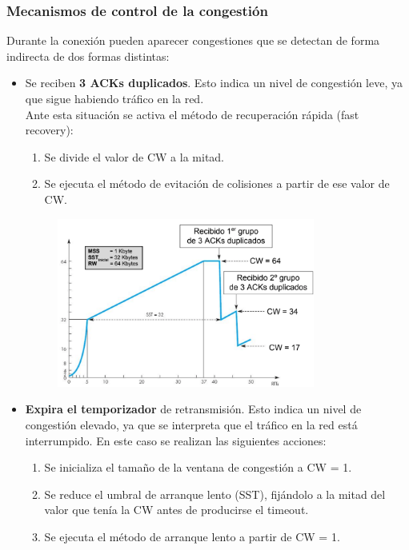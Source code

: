 \subsubsection{Mecanismos de control de la congestión}
Durante la conexión pueden aparecer congestiones que se detectan de forma indirecta de dos formas distintas:
\begin{itemize}
    \item Se reciben \textbf{3 ACKs duplicados}. Esto indica un nivel de congestión leve, ya que sigue habiendo tráfico en la red.\\
    
    Ante esta situación se activa el método de recuperación rápida (fast recovery):
    \begin{enumerate}
        \item Se divide el valor de CW a la mitad.
        \item Se ejecuta el método de evitación de colisiones a partir de ese valor de CW.
    \end{enumerate}
        \begin{figure}[H] \centering
        \includegraphics[width=0.8\textwidth]{img/TCP_3acks.png}\end{figure}
    \item \textbf{Expira el temporizador} de retransmisión. Esto indica un nivel de congestión elevado, ya que se interpreta que el tráfico en la red está interrumpido.
    En este caso se realizan las siguientes acciones:
    \begin{enumerate}
        \item Se inicializa el tamaño de la ventana de congestión a CW = 1.
        \item Se reduce el umbral de arranque lento (SST), fijándolo a la mitad del valor que tenía la CW antes de producirse el timeout.
        \item Se ejecuta el método de arranque lento a partir de CW = 1.

\end{enumerate}
\end{itemize}
